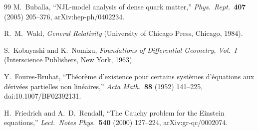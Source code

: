 \documentclass[11pt]{article}
\begin{document}
\begin{thebibliography}{99}
 M.~Buballa, ``NJL-model analysis of dense quark
matter,'' \emph{Phys.\ Rept.}\ \textbf{407} (2005) 205--376,
arXiv:hep-ph/0402234.

 R.~M.~Wald, \emph{General Relativity}
(University of Chicago Press, Chicago, 1984).

 S.~Kobayashi and K.~Nomizu,
\emph{Foundations of Differential Geometry, Vol.~I}
(Interscience Publishers, New York, 1963).

 Y.~Foures-Bruhat, ``Th\'eor\`eme
d'existence pour certains syst\`emes d'\'equations aux d\'eriv\'ees
partielles non lin\'eaires,'' \emph{Acta Math.}\ \textbf{88} (1952)
141--225, doi:10.1007/BF02392131.

 H.~Friedrich and A.~D.~Rendall, ``The
Cauchy problem for the Einstein equations,'' \emph{Lect.\ Notes
Phys.}\ \textbf{540} (2000) 127--224, arXiv:gr-qc/0002074.

\end{thebibliography}






\end{document}
